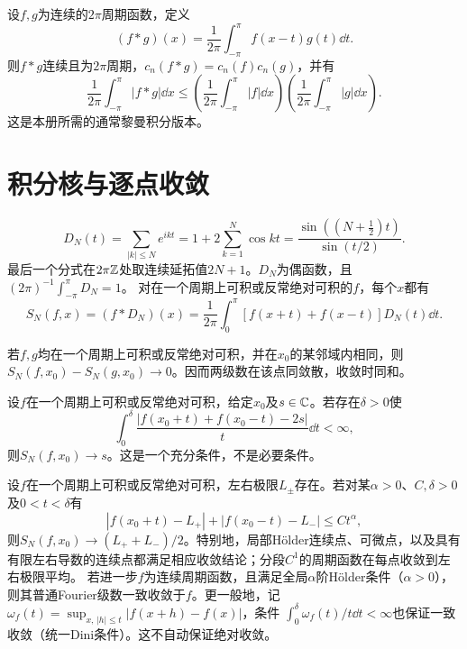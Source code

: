 \begin{result}[连续周期函数的卷积]\label{st:convolution}
设$f,g$为连续的$2\pi$周期函数，定义
\[
 (f*g)(x)=\frac1{2\pi}\int_{-\pi}^{\pi}f(x-t)g(t)\dd t.
\]
则$f*g$连续且为$2\pi$周期，$c_n(f*g)=c_n(f)c_n(g)$，并有
\[
 \frac1{2\pi}\int_{-\pi}^{\pi}|f*g|\dd x
 \le\left(\frac1{2\pi}\int_{-\pi}^{\pi}|f|\dd x\right)
     \left(\frac1{2\pi}\int_{-\pi}^{\pi}|g|\dd x\right).
\]
这是本册所需的通常黎曼积分版本。
\end{result}

\section{积分核与逐点收敛}
\begin{result}[Dirichlet核与卷积公式]\label{st:D}
\[
 D_N(t)=\sum_{|k|\le N}e^{ikt}=1+2\sum_{k=1}^N\cos kt
 =\frac{\sin((N+\tfrac12)t)}{\sin(t/2)}.
\]
最后一个分式在$2\pi\mathbb Z$处取连续延拓值$2N+1$。$D_N$为偶函数，且$(2\pi)^{-1}\int_{-\pi}^{\pi}D_N=1$。
对在一个周期上可积或反常绝对可积的$f$，每个$x$都有
\[
 S_N(f,x)=(f*D_N)(x)
 =\frac1{2\pi}\int_0^\pi[f(x+t)+f(x-t)]D_N(t)\dd t.
\]
\end{result}
\begin{result}[局部化原理]\label{st:localization}
若$f,g$均在一个周期上可积或反常绝对可积，并在$x_0$的某邻域内相同，则
$S_N(f,x_0)-S_N(g,x_0)\to0$。因而两级数在该点同敛散，收敛时同和。
\end{result}
\begin{result}[Dini判别法]\label{st:dini}
设$f$在一个周期上可积或反常绝对可积，给定$x_0$及$s\in\mathbb C$。若存在$\delta>0$使
\[
 \int_0^\delta\frac{|f(x_0+t)+f(x_0-t)-2s|}{t}\dd t<\infty,
\]
则$S_N(f,x_0)\to s$。这是一个充分条件，不是必要条件。
\end{result}
\begin{result}\label{st:holderpoint}
设$f$在一个周期上可积或反常绝对可积，左右极限$L_\pm$存在。若对某$\alpha>0$、$C,\delta>0$及$0<t<\delta$有
\[
 |f(x_0+t)-L_+|+|f(x_0-t)-L_-|\le Ct^\alpha,
\]
则$S_N(f,x_0)\to(L_++L_-)/2$。特别地，局部H\"older连续点、可微点，以及具有有限左右导数的连续点都满足相应收敛结论；分段$C^1$的周期函数在每点收敛到左右极限平均。
若进一步$f$为连续周期函数，且满足全局$\alpha$阶H\"older条件（$\alpha>0$），则其普通Fourier级数一致收敛于$f$。更一般地，记
$\omega_f(t)=\sup_{x,\,|h|\le t}|f(x+h)-f(x)|$，条件
$\int_0^\delta\omega_f(t)/t\dd t<\infty$也保证一致收敛（统一Dini条件）。这不自动保证绝对收敛。
\end{result}
